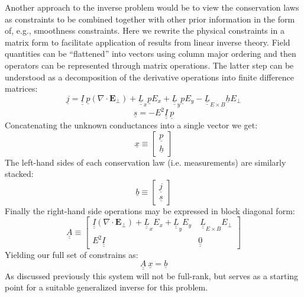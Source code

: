 \documentclass[11pt,letterpaper]{article}
\begin{document}
Another approach to the inverse problem would be to view the conservation laws as constraints to be combined together with other prior information in the form of, e.g., smoothness constraints.  Here we rewrite the physical constraints in a matrix form to facilitate application of results from linear inverse theory.  Field quantities can be ``flattened'' into vectors using column major ordering and then operators can be represented through matrix operations.  The latter step can be understood as a decomposition of the derivative operations into finite difference matrices:
\begin{equation}
\underline{j} = \underline{\underline{I}} ~ \underline{p} \left( \nabla \cdot \mathbf{E}_\perp \right) + \underline{\underline{L}}_x \underline{p} E_x + \underline{\underline{L}}_y \underline{p} E_y - \underline{\underline{L}}_{E \times B} \underline{h} E_\perp
\end{equation}
\begin{equation}
\underline{s} = - E^2 \underline{\underline{I}} ~ \underline{p}
\end{equation}
Concatenating the unknown conductances into a single vector we get:
\begin{equation}
\underline{x} \equiv \left[ \begin{array}{c} \underline{p} \\ \underline{h} \end{array} \right]
\end{equation}
The left-hand sides of each conservation law (i.e. measurements) are similarly stacked:
\begin{equation}
\underline{b} \equiv \left[ \begin{array}{c} \underline{j} \\ \underline{s} \end{array} \right]
\end{equation}
Finally the right-hand side operations may be expressed in block diagonal form:
\begin{equation}
\underline{\underline{A}} \equiv \left[ \begin{array}{cc} \underline{\underline{I}}  \left( \nabla \cdot \mathbf{E}_\perp \right) +  \underline{\underline{L}}_x  E_x + \underline{\underline{L}}_y E_y  & ~ \underline{\underline{L}}_{E \times B} E_\perp \\ E^2 \underline{\underline{I}} & \underline{\underline{0}} \end{array} \right]
\end{equation}
Yielding our full set of constrains as:
\begin{equation}
\underline{\underline{A}} ~ \underline{x} = \underline{b}
\end{equation}
As discussed previously this system will not be full-rank, but serves as a starting point for a suitable generalized inverse for this problem.  
\end{document}
